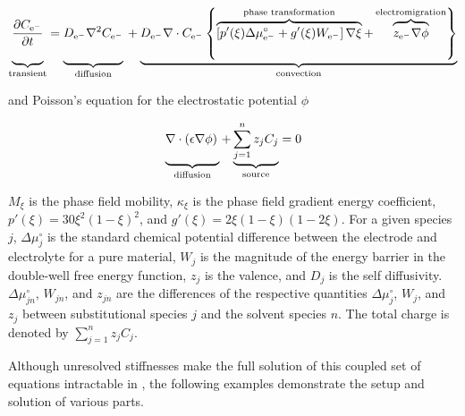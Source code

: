 \begin{equation}
    \label{eq:elphf:interstitial}
    \underbrace{
	\frac{\partial C_{\text{e}^{-}}}{\partial t}
	\vphantom{\left\{
	    \overbrace{
		\left[p'(\xi)\right]
	    }^{\text{phase transformation}}
	\right\}}
    }_{\text{transient}}
    = \underbrace{
	D_{\text{e}^{-}}\nabla^2 C_{\text{e}^{-}} 
	\vphantom{\left\{
	    \overbrace{
		\left[p'(\xi)\right]
	    }^{\text{phase transformation}}
	\right\}}
    }_{\text{diffusion}} \\
    + \underbrace{
	D_{\text{e}^{-}}\nabla\cdot 
	C_{\text{e}^{-}}
	\left\{
	    \overbrace{
		\left[
		    p'(\xi) \Delta\mu_{\text{e}^{-}}^{\circ}
		    + g'(\xi) W_{\text{e}^{-}}
		\right] \nabla\xi
	    }^{\text{phase transformation}}
	    +
	    \overbrace{
		z_{\text{e}^{-}} \nabla \phi
		\vphantom{\left[p'(\xi)\right]}
	   }^{\text{electromigration}}
	\right\}
    }_{\text{convection}}
\end{equation}

and Poisson's equation for the electrostatic potential \( \phi \)

\begin{equation}
    \label{eq:elphf:Poisson}
    \underbrace{
	\nabla\cdot\left(\epsilon\nabla\phi\right) 
	\vphantom{\sum_{j=1}^n z_j C_j}
    }_{\text{diffusion}}
    +
    \underbrace{
	\sum_{j=1}^n z_j C_j
    }_{\text{source}}
    = 0
\end{equation}

\( M_\xi \) is the phase field mobility, \( \kappa_\xi \) is the phase
field gradient energy coefficient, \( p'(\xi) =
30\xi^2\left(1-\xi\right)^2 \), and \( g'(\xi) =
2\xi\left(1-\xi\right)\left(1-2\xi\right) \).  For a given species \(
j \), \( \Delta\mu_j^{\circ} \) is the standard chemical potential
difference between the electrode and electrolyte for a pure material,
\( W_j \) is the magnitude of the energy barrier in the double-well
free energy function, \( z_j \) is the valence, and \( D_{j} \) is the
self diffusivity.  \( \Delta\mu_{jn}^{\circ} \), \( W_{jn} \), and \(
z_{jn} \) are the differences of the respective quantities \(
\Delta\mu_{j}^{\circ} \), \( W_{j} \), and \( z_{j} \) between
substitutional species \( j \) and the solvent species \( n \).  The
total charge is denoted by \( \sum_{j=1}^n z_j C_j \).

Although unresolved stiffnesses make the full solution of this coupled
set of equations intractable in \FiPy{}, the following examples 
demonstrate the setup and solution of various parts.

